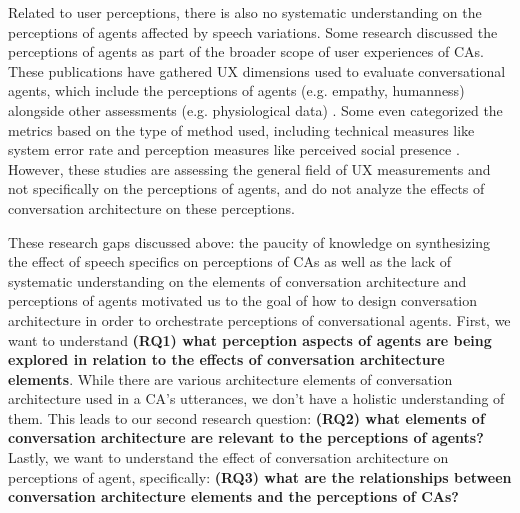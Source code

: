 Related to user perceptions, there is also no systematic understanding on the perceptions of agents affected by speech variations. Some research discussed the perceptions of agents as part of the broader scope of user experiences of CAs. These publications have gathered UX dimensions used to evaluate conversational agents, which include the perceptions of agents (e.g. empathy, humanness) alongside other assessments (e.g. physiological data) \cite{clark2019state}\cite{finch2020towards}. Some even categorized the metrics based on the type of method used, including technical measures like system error rate and perception measures like perceived social presence \cite{zheng2022ux}. However, these studies are assessing the general field of UX measurements and not specifically on the perceptions of agents, and do not analyze the effects of conversation architecture on these perceptions.

These research gaps discussed above: the paucity of knowledge on synthesizing the effect of speech specifics on perceptions of CAs as well as the lack of systematic understanding on the elements of conversation architecture and perceptions of agents motivated us to the goal of how to design conversation architecture in order to orchestrate perceptions of conversational agents. First, we want to understand \textbf{(RQ1) what perception aspects of agents are being explored in relation to the effects of conversation architecture elements}. While there are various architecture elements of conversation architecture used in a CA's utterances, we don't have a holistic understanding of them. This leads to our second research question: \textbf{(RQ2) what elements of conversation architecture are relevant to the perceptions of agents?} Lastly, we want to understand the effect of conversation architecture on perceptions of agent, specifically: \textbf{(RQ3) what are the relationships between conversation architecture elements and the perceptions of CAs?}

